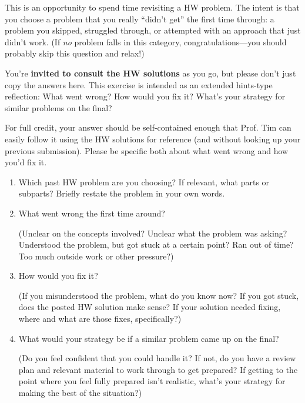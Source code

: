 \documentclass[12 pt, letterpaper]{hmcpset}
\begin{document}
\begin{problem}
This is an opportunity to spend time revisiting a HW problem. The intent is that you choose a problem that you really ``didn't get'' the first time through: a problem you skipped, struggled through, or attempted with an approach that just didn't work. (If \emph{no} problem falls in this category, congratulations---you should probably skip this question and relax!)

You're \textbf{invited to consult the HW solutions} as you go, but please don't just copy the answers here. This exercise is intended as an extended hints-type reflection: What went wrong? How would you fix it? What's your strategy for similar problems on the final?

For full credit, your answer should be self-contained enough that Prof. Tim can easily follow it using the HW solutions for reference (and without looking up your previous submission). Please be specific both about what went wrong and how you'd fix it.

\begin{enumerate}
    \item Which past HW problem are you choosing? If relevant, what parts or subparts? Briefly restate the problem in your own words.
    
    \item What went wrong the first time around? 
    
    (Unclear on the concepts involved? Unclear what the problem was asking? Understood the problem, but got stuck at a certain point? Ran out of time? Too much outside work or other pressure?)
    \item How would you fix it? 
    
    (If you misunderstood the problem, what do you know now? If you got stuck, does the posted HW solution make sense? If your solution needed fixing, where and what are those fixes, specifically?) 
    
    \item What would your strategy be if a similar problem came up on the final? 
    
    (Do you feel confident that you could handle it? If not, do you have a review plan and relevant material to work through to get prepared? If getting to the point where you feel fully prepared isn't realistic, what's your strategy for making the best of the situation?)
\end{enumerate}
\end{problem}
\end{document}

